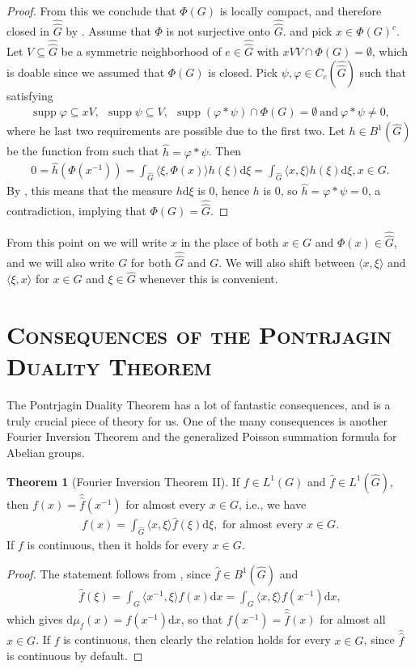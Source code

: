 \documentclass[10pt,twoside,openany,final]{memoir}
\newcommand{\sssection}[1]{%
\section[#1]{\centering\normalfont\scshape \textbf{#1}}}
\theoremstyle{definition}
\newtheorem{theorem}{Theorem}[chapter]
\theoremstyle{Break}
\newcommand{\G}{\widehat{G}}
\DeclareMathOperator{\supp}{supp}
\renewcommand{\d}{\mathrm{d}}
\begin{document}
\begin{proof}
	From this we conclude that $\Phi(G)$ is locally compact, and therefore closed in $\widehat{\G}$ by . Assume that $\Phi$ is not surjective onto $\widehat{\G}$. and pick $x \in \Phi(G)^c$. Let $V \subseteq \widehat{\G}$ be a symmetric neighborhood of $e\in \widehat{\G}$ with $xVV \cap \Phi(G) = \emptyset$, which is doable since we assumed that $\Phi(G)$ is closed. Pick $\psi,\varphi \in C_c(\widehat{\G})$ such that satisfying
	\begin{align*}
		\supp \varphi \subseteq xV, \ \ \supp \psi \subseteq V, \ \ \supp (\varphi \ast \psi) \cap \Phi(G) = \emptyset\ \text{and} \ \varphi \ast \psi \neq 0,
	\end{align*}
	where he last two requirements are possible due to the first two. Let $h \in B^1(\G)$ be the function from  such that $\widehat{h}=\varphi \ast \psi$. Then
	\begin{align*}
		0 = \widehat{h}(\Phi(x^{-1}))=\int_{\G} \langle \xi , \Phi(x)\rangle h(\xi) \d \xi=\int_{\G} \langle x , \xi \rangle h(\xi) \d \xi, x \in G.
	\end{align*}
	By , this means that the measure $h \d \xi$ is $0$, hence $h$ is $0$, so $\widehat{h}=\varphi \ast \psi=0$, a contradiction, implying that $\Phi(G)=\widehat{\G}$.
\end{proof}
From this point on we will write $x$ in the place of both $x \in G$ and $\Phi(x) \in \widehat{\G}$, and we will also write $G$ for both $\widehat{\G}$ and $G$. We will also shift between $\langle x , \xi\rangle$ and $\langle \xi , x \rangle$ for $x \in G$ and $\xi \in \G$ whenever this is convenient.
\sssection{Consequences of the Pontrjagin Duality Theorem}
The Pontrjagin Duality Theorem has a lot of fantastic consequences, and is a truly crucial piece of theory for us. One of the many consequences is another Fourier Inversion Theorem and the generalized Poisson summation formula for Abelian groups.
\begin{theorem}[Fourier Inversion Theorem II]
	If $f \in L^1(G)$ and $\widehat{f} \in L^1(\G)$, then $f(x)= \widehat{\widehat{f}}(x^{-1})$ for almost every $x \in G$, i.e., we have
	\begin{align*}
		f(x) = \int _{\G} \langle x, \xi \rangle \widehat{f}(\xi) \d \xi, \text{ for almost every } x \in G.
	\end{align*}
	If $f$ is continuous, then it holds for every $x \in G$.
	\label{4.32}
\end{theorem}
\begin{proof}
	The statement follows from , since $\widehat{f}\in B^1(\G)$ and
	\begin{align*}
		\widehat{f}(\xi)=\int_{G} \langle x^{-1} , \xi \rangle f(x) \d x = \int_{G} \langle x , \xi \rangle f(x^{-1}) \d x,
	\end{align*}
	which gives $\d \mu_{\widehat{f}}(x) = f(x^{-1}) \d x$, so that $f(x^{-1}) = \widehat{\widehat{f}}(x)$ for almost all $x \in G$. If $f$ is continuous, then clearly the relation holds for every $x \in G$, since $\widehat{\widehat{f}}$ is continuous by default.
\end{proof}
\end{document}
